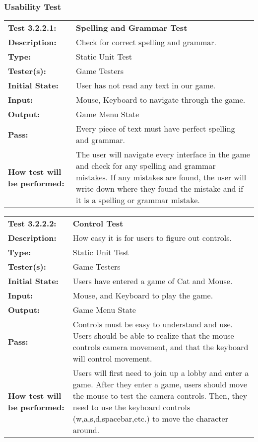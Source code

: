 \documentclass[12pt, titlepage]{article}
\begin{document}
\subsubsection{Usability Test}
\begin{mdframed}[linewidth=1pt]
\begin{tabularx}{\textwidth}{@{}p{3cm}X@{}}
{\bf Test 3.2.2.1:} & {\bf Spelling and Grammar Test}\\[\baselineskip]
{\bf Description:} & Check for correct spelling and grammar.\\[0.5\baselineskip]
{\bf Type:} & Static Unit Test\\[0.5\baselineskip]
{\bf Tester(s):} & Game Testers\\[0.5\baselineskip]
{\bf Initial State:} & User has not read any text in our game.\\[0.5\baselineskip]
{\bf Input:} & Mouse, Keyboard to navigate through the game.\\[0.5\baselineskip]
{\bf Output:} & Game Menu State\\[0.5\baselineskip]
{\bf Pass:} & Every piece of text must have perfect spelling and grammar.\\[0.5\baselineskip]
{\bf How test will be performed:} & The user will navigate every interface in the game and check for any spelling and grammar mistakes. If any mistakes are found, the user will write down where they found the mistake and if it is a spelling or grammar mistake. 
\end{tabularx}
\end{mdframed}

\begin{mdframed}[linewidth=1pt]
\begin{tabularx}{\textwidth}{@{}p{3cm}X@{}}
{\bf Test 3.2.2.2:} & {\bf Control Test}\\[\baselineskip]
{\bf Description:} & How easy it is for users to figure out controls.\\[0.5\baselineskip]
{\bf Type:} & Static Unit Test\\[0.5\baselineskip]
{\bf Tester(s):} & Game Testers\\[0.5\baselineskip]
{\bf Initial State:} & Users have entered a game of Cat and Mouse. \\[0.5\baselineskip]
{\bf Input:} & Mouse, and Keyboard to play the game.\\[0.5\baselineskip]
{\bf Output:} & Game Menu State\\[0.5\baselineskip]
{\bf Pass:} & Controls must be easy to understand and use. Users should be able to realize that the mouse controls camera movement, and that the keyboard will control movement.\\[0.5\baselineskip]
{\bf How test will be performed:} & Users will first need to join up a lobby and enter a game. After they enter a game, users should move the mouse to test the camera controls. Then, they need to use the keyboard controls (w,a,s,d,spacebar,etc.) to move the character around.
\end{tabularx}
\end{mdframed}				
\end{document}
